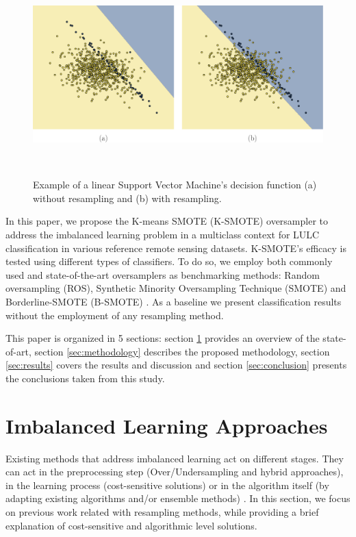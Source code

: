 \documentclass[parskip=full]{scrartcl}
\begin{document}
\begin{figure}[H]
	\centering
	\includegraphics[width=.85\linewidth]{../analysis/resampling_decision_function}
	\caption{Example of a linear Support Vector Machine's decision function (a) without
		resampling and (b) with resampling.
    }~\label{fig:oversampling_decision_function}
\end{figure}

In this paper, we propose the K-means SMOTE (K-SMOTE) \cite{Douzas2018}
oversampler to address the imbalanced learning problem in a multiclass context
for LULC classification in various reference remote sensing datasets. K-SMOTE's
efficacy is tested using different types of classifiers. To do so, we employ
both commonly used and state-of-the-art oversamplers as benchmarking methods:
Random oversampling (ROS), Synthetic Minority Oversampling Technique (SMOTE)
\cite{Chawla2002} and Borderline-SMOTE (B-SMOTE) \cite{Han2005}.
As a baseline we present classification results without the employment of any
resampling method.

This paper is organized in 5 sections: section \ref{sec:sota} provides
an overview of the state-of-art, section \ref{sec:methodology} describes the
proposed methodology, section \ref{sec:results} covers the results and
discussion and section \ref{sec:conclusion} presents the conclusions taken
from this study.

\section{Imbalanced Learning Approaches} \label{sec:sota}

Existing methods that address imbalanced learning act on different stages. They
can act in the preprocessing step (Over/Undersampling and hybrid approaches),
in the learning process (cost-sensitive solutions) or in the algorithm itself
(by adapting existing algorithms and/or ensemble methods)
\cite{Kaur2019}. In this section, we focus on previous work related
with resampling methods, while providing a brief explanation of cost-sensitive
and algorithmic level solutions.
\end{document}
